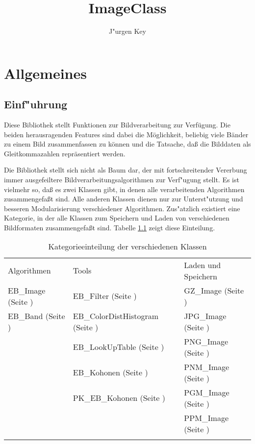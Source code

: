 \documentclass[12pt,a4paper,draft,twoside,onecolumn,titlepage]{book}
\title{ImageClass}
\author{J"urgen Key}
\newcommand{\pref}[1]{(Seite \pageref{#1})}
\begin{document}
\maketitle
\tableofcontents
\part{Allgemeines}
\chapter{Einf"uhrung}
Diese Bibliothek stellt Funktionen zur Bildverarbeitung zur Verf{\"u}gung. Die
beiden herausragenden Features sind dabei die M{\"o}glichkeit, beliebig viele
B{\"a}nder zu einem Bild zusammenfassen zu k{\"o}nnen und die Tatsache, da{\ss}
die Bilddaten als Gleitkommazahlen repr{\"a}sentiert werden.

Die Bibliothek stellt sich nicht als Baum dar, der mit fortschreitender Vererbung immer ausgefeiltere Bildverarbeitungsalgorithmen zur Verf"ugung stellt. Es ist vielmehr so, da{\ss} es zwei Klassen gibt, in denen alle verarbeitenden Algorithmen zusammengefa{\ss}t sind. Alle anderen Klassen dienen nur zur Unterst"utzung und besseren Modularisierung verschiedener Algorithmen. Zus"atzlich existiert eine Kategorie, in der alle Klassen zum Speichern und Laden von verschiedenen Bildformaten zusammengefa{\ss}t sind. Tabelle \ref{tableclasscategories} zeigt diese Einteilung.
\begin{table}
\small
\begin{tabular}{|l|l|l|}
Algorithmen&Tools&Laden und Speichern\\
EB\_Image \pref{classebimage}&EB\_Filter \pref{classebfilter}&GZ\_Image \pref{classgzimage}\\
EB\_Band \pref{classebband}&EB\_ColorDistHistogram \pref{classcolordisthistogram}&JPG\_Image \pref{classjpgimage}\\
&EB\_LookUpTable \pref{classeblookuptable}&PNG\_Image \pref{classpngimage}\\
&EB\_Kohonen \pref{classebkohonen}&PNM\_Image \pref{classpnmimage}\\
&PK\_EB\_Kohonen \pref{classpkebkohonen}&PGM\_Image \pref{classpgmimage}\\
&&PPM\_Image \pref{classppmimage}\\
\label{tableclasscategories}
\end{tabular}
\caption{Kategorieeinteilung der verschiedenen Klassen}
\end{table}
\end{document}
